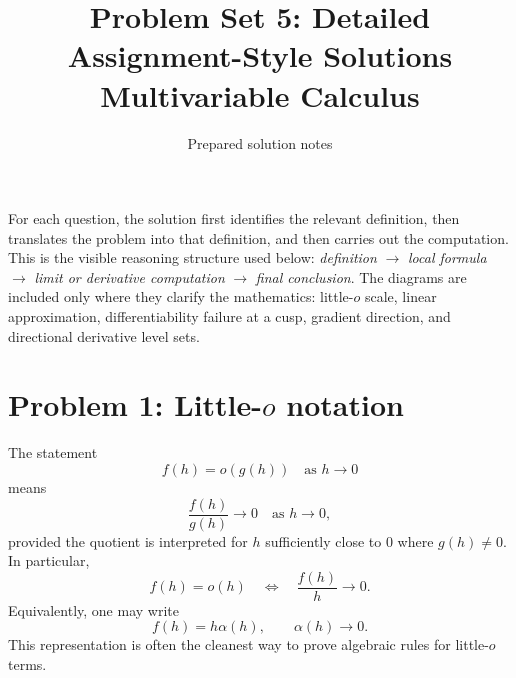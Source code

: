 \documentclass[11pt]{article}
\title{\textbf{Problem Set 5: Detailed Assignment-Style Solutions}\\[0.25em]
\large Multivariable Calculus}
\author{Prepared solution notes}
\date{}
\begin{document}
\maketitle
\thispagestyle{empty}

\begin{center}
\end{center}

\begin{methodbox}
For each question, the solution first identifies the relevant definition, then translates the problem into that definition, and then carries out the computation.  This is the visible reasoning structure used below: \emph{definition} $\to$ \emph{local formula} $\to$ \emph{limit or derivative computation} $\to$ \emph{final conclusion}.  The diagrams are included only where they clarify the mathematics: little-$o$ scale, linear approximation, differentiability failure at a cusp, gradient direction, and directional derivative level sets.
\end{methodbox}

\newpage
\tableofcontents
\newpage

\section{Problem 1: Little-$o$ notation}

The statement
\[
 f(h)=o(g(h))\quad\text{as }h\to 0
\]
means
\[
 \frac{f(h)}{g(h)}\to 0\quad\text{as }h\to 0,
\]
provided the quotient is interpreted for $h$ sufficiently close to $0$ where $g(h)\neq 0$.  In particular,
\[
 f(h)=o(h)\quad\Longleftrightarrow\quad \frac{f(h)}{h}\to 0.
\]
Equivalently, one may write
\[
 f(h)=h\alpha(h),\qquad \alpha(h)\to 0.
\]
This representation is often the cleanest way to prove algebraic rules for little-$o$ terms.
\end{document}
